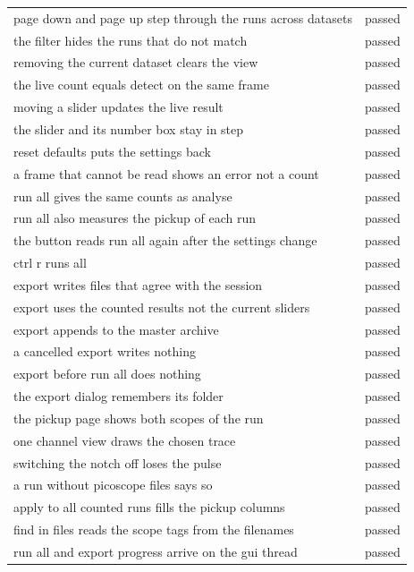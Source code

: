 \documentclass[10pt,a4paper]{article}
\begin{document}
\begin{longtable}{@{}p{}r@{}}
page down and page up step through the runs across datasets & passed \\
the filter hides the runs that do not match & passed \\
removing the current dataset clears the view & passed \\
the live count equals detect on the same frame & passed \\
moving a slider updates the live result & passed \\
the slider and its number box stay in step & passed \\
reset defaults puts the settings back & passed \\
a frame that cannot be read shows an error not a count & passed \\
run all gives the same counts as analyse & passed \\
run all also measures the pickup of each run & passed \\
the button reads run all again after the settings change & passed \\
ctrl r runs all & passed \\
export writes files that agree with the session & passed \\
export uses the counted results not the current sliders & passed \\
export appends to the master archive & passed \\
a cancelled export writes nothing & passed \\
export before run all does nothing & passed \\
the export dialog remembers its folder & passed \\
the pickup page shows both scopes of the run & passed \\
one channel view draws the chosen trace & passed \\
switching the notch off loses the pulse & passed \\
a run without picoscope files says so & passed \\
apply to all counted runs fills the pickup columns & passed \\
find in files reads the scope tags from the filenames & passed \\
run all and export progress arrive on the gui thread & passed \\
\bottomrule
\end{longtable}
\end{document}
